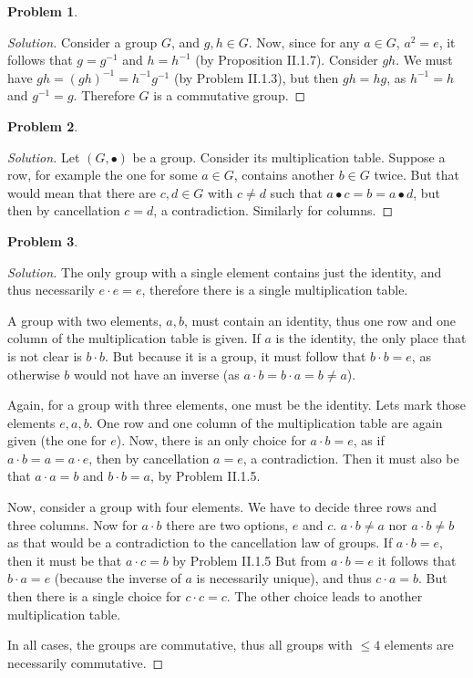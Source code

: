 \documentclass{article}
\theoremstyle{definition}
\newtheorem{problem-internal}{Problem}[subsection]
\newenvironment{problem}{
	\medskip
	\begin{problem-internal}
	}{
\end{problem-internal}
}
\newenvironment{solution}{
	\begin{proof}[Solution]
		\vspace{-8px}
		\setlength{\parskip}{4px}
		\setlength{\parindent}{0px}
	}{
\end{proof}
}
\begin{document}
\begin{problem}
\end{problem}

\begin{solution}
	Consider a group $G$, and $g, h \in G$. Now, since for any $a \in G$, $a^2 = e$, it follows that $g = g^{-1}$ and $h = h^{-1}$ (by Proposition II.1.7). Consider $gh$. We must have $gh = (gh)^{-1} = h^{-1}g^{-1}$ (by Problem II.1.3), but then $gh = hg$, as $h^{-1} = h$ and $g^{-1} = g$. Therefore $G$ is a commutative group.
\end{solution}

\begin{problem}
\end{problem}

\begin{solution}
	Let $(G, \bullet)$ be a group. Consider its multiplication table. Suppose a row, for example the one for some $a \in G$, contains another $b \in G$ twice. But that would mean that there are $c, d \in G$ with $c \neq d$ such that $a \bullet c = b = a \bullet d$, but then by cancellation $c = d$, a contradiction. Similarly for columns.
\end{solution}

\begin{problem}
\end{problem}

\begin{solution}
	The only group with a single element contains just the identity, and thus necessarily $e \cdot e = e$, therefore there is a single multiplication table.
	
	A group with two elements, $a,b$, must contain an identity, thus one row and one column of the multiplication table is given. If $a$ is the identity, the only place that is not clear is $b \cdot b$. But because it is a group, it must follow that $b \cdot b = e$, as otherwise $b$ would not have an inverse (as $a \cdot b = b \cdot a = b \neq a$).
	
	Again, for a group with three elements, one must be the identity. Lets mark those elements $e, a, b$. One row and one column of the multiplication table are again given (the one for $e$). Now, there is an only choice for $a \cdot b = e$, as if $a \cdot b = a = a \cdot e$, then by cancellation $a = e$, a contradiction. Then it must also be that $a \cdot a = b$ and $b \cdot b = a$, by Problem II.1.5.
	
	Now, consider a group with four elements. We have to decide three rows and three columns. Now for $a \cdot b$ there are two options, $e$ and $c$. $a \cdot b \neq a$ nor $a \cdot b \neq b$ as that would be a contradiction to the cancellation law of groups. If $a \cdot b = e$, then it must be that $a \cdot c = b$ by Problem II.1.5 But from $a \cdot b = e$ it follows that $b \cdot a = e$ (because the inverse of $a$ is necessarily unique), and thus $c \cdot a = b$. But then there is a single choice for $c \cdot c = c$. The other choice leads to another multiplication table.
	
	In all cases, the groups are commutative, thus all groups with $\leq 4$ elements are necessarily commutative.
\end{solution}
\end{document}
